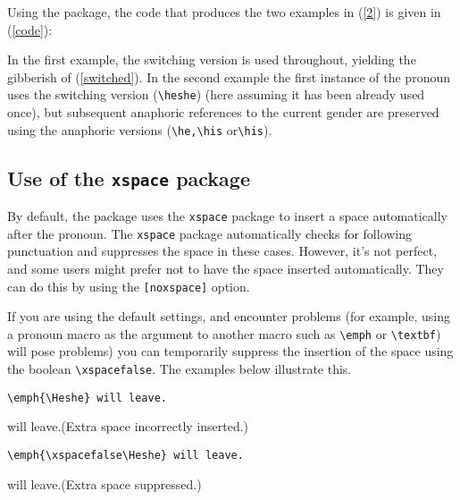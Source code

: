\documentclass[11pt]{article}
\newcommand*\bs{\textbackslash}
\newcommand*{\pkg}[1]{\texttt{#1}\xspace}
\begin{document}
Using the package, the code that produces the two examples in (\ref{2}) is given in (\ref{code}):

\begin{exe}
\ex\label{code}
\end{exe}

In the first example, the switching version is used throughout, yielding the gibberish of (\ref{switched}). In the second example the first instance of the pronoun uses the switching version (\pkg{\bs heshe}) (here assuming it has been already used once), but subsequent anaphoric references to the current gender are preserved using the anaphoric versions (\pkg{\bs he,\bs his} or\pkg{\bs his}).

\subsection{Use of the \pkg{xspace} package}
By default, the package uses the \pkg{xspace} package to insert a space automatically after the pronoun. The \pkg{xspace} package automatically checks for following punctuation and suppresses the space in these cases.  However, it's not perfect, and some users might prefer not to have the space inserted automatically.  They can do this by using the \pkg{[noxspace]} option.

If you are using the default settings, and encounter problems (for example, using a pronoun macro as the argument to another macro such as \pkg{\bs emph} or \pkg{\bs textbf}) will pose problems) you can temporarily suppress the insertion of the space using the boolean \pkg{\bs xspacefalse}. The examples below illustrate this.

\begin{exe}
\ex\label{xspaces}
\begin{xlist}
\ex \begin{lstlisting}
\emph{\Heshe} will leave.
\end{lstlisting}
\ex \emph{\Heshe} will leave.\hfill(Extra space incorrectly inserted.)
\ex\begin{lstlisting}
\emph{\xspacefalse\Heshe} will leave.
\end{lstlisting}
\ex \emph{\hetrue\xspacefalse\Heshe} will leave.\hfill(Extra space suppressed.)
\end{xlist}
\end{exe}
\end{document}
